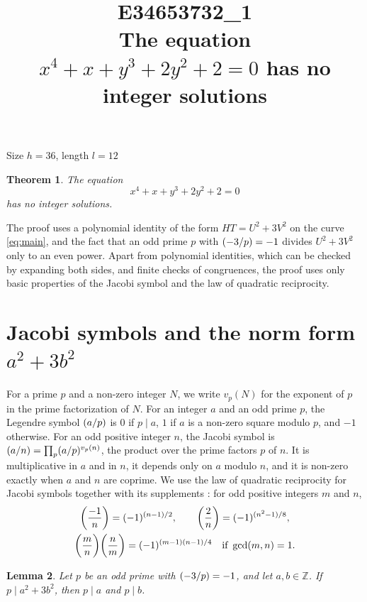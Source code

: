 \documentclass[11pt]{article}
\title{\textbf{E34653732\_1}\\[4pt] {\Large The equation $x^{4}+x+y^{3}+2y^{2}+2=0$ has no integer solutions}}
\author{}
\date{}
\newtheorem{theorem}{Theorem}
\newtheorem{lemma}[theorem]{Lemma}
\newcommand{\Z}{\mathbb{Z}}
\newcommand{\leg}[2]{\mathchoice{\biggl(\dfrac{#1}{#2}\biggr)}{(#1/#2)}{(#1/#2)}{(#1/#2)}}
\begin{document}
\maketitle
\vspace{-8ex}
\begin{center}
Size $h=36$, length $l=12$
\end{center}

\begin{theorem}\label{thm:main}
The equation
\begin{equation}\label{eq:main}
x^{4}+x+y^{3}+2y^{2}+2=0
\end{equation}
has no integer solutions.
\end{theorem}

The proof uses a polynomial identity of the form $HT=U^2+3V^2$ on the curve \eqref{eq:main}, and the fact that an odd prime $p$ with $\leg{-3}{p}=-1$ divides $U^2+3V^2$ only to an even power. Apart from polynomial identities, which can be checked by expanding both sides, and finite checks of congruences, the proof uses only basic properties of the Jacobi symbol and the law of quadratic reciprocity.

\section{\texorpdfstring{Jacobi symbols and the norm form $a^2+3b^2$}{Jacobi symbols and the norm form}}

For a prime $p$ and a non-zero integer $N$, we write $v_p(N)$ for the exponent of $p$ in the prime factorization of $N$. For an integer $a$ and an odd prime $p$, the Legendre symbol $\leg{a}{p}$ is $0$ if $p\mid a$, $1$ if $a$ is a non-zero square modulo $p$, and $-1$ otherwise. For an odd positive integer $n$, the Jacobi symbol is $\leg{a}{n}=\prod_p\leg{a}{p}^{v_p(n)}$, the product over the prime factors $p$ of $n$. It is multiplicative in $a$ and in $n$, it depends only on $a$ modulo $n$, and it is non-zero exactly when $a$ and $n$ are coprime. We use the law of quadratic reciprocity for Jacobi symbols together with its supplements \cite[Chapter~5, \S2]{IR}: for odd positive integers $m$ and $n$,
\begin{gather*}
\leg{-1}{n}=(-1)^{(n-1)/2},\qquad\leg{2}{n}=(-1)^{(n^2-1)/8},\\
\leg{m}{n}\leg{n}{m}=(-1)^{(m-1)(n-1)/4}\quad\text{if }\gcd(m,n)=1.
\end{gather*}

\begin{lemma}\label{lem:divides}
Let $p$ be an odd prime with $\leg{-3}{p}=-1$, and let $a,b\in\Z$. If $p\mid a^2+3b^2$, then $p\mid a$ and $p\mid b$.
\end{lemma}
\end{document}
